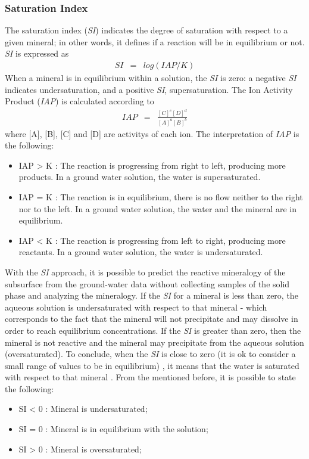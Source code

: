 \subsubsection{Saturation Index}
The saturation index (\emph{SI}) indicates the degree of saturation with respect to a given mineral; in other words, it defines if a reaction will be in equilibrium or not. \emph{SI} is expressed as
\begin{eqnarray} \label{eq:siEq}
SI &=& log (IAP / K )
\end{eqnarray}
When a mineral is in equilibrium within a solution, the \emph{SI} is zero: a negative \emph{SI} indicates undersaturation, and a positive \emph{SI}, supersaturation. 
The Ion Activity Product (\emph{IAP}) is calculated according to
\begin{eqnarray}
IAP &=& \frac{[C]^c [D]^d}{[A]^a[B]^b}
\end{eqnarray}
where [A], [B], [C] and [D] are activitys of each ion. The interpretation of \emph{IAP} is the following:
\begin{itemize}
\item IAP > K : The reaction is progressing from right to left, producing more products. In a ground water solution, the water is supersaturated.
\item IAP = K : The reaction is in equilibrium, there is no flow neither to the right nor to the left. In a ground water solution, the water and the mineral are in equilibrium.
\item IAP < K : The reaction is progressing from left to right, producing more reactants. In a ground water solution, the water is undersaturated.
\end{itemize}

With the \emph{SI} approach, it is possible to predict the reactive mineralogy of the subsurface from the ground-water data without collecting samples of the solid phase and analyzing the mineralogy. If the \emph{SI} for a mineral is less than zero, the aqueous solution is undersaturated with respect to that mineral - which corresponds to the fact that the mineral will not precipitate and may dissolve in order to reach equilibrium concentrations. If the \emph{SI} is greater than zero, then the mineral is not reactive and the mineral may precipitate from the aqueous solution (oversaturated). To conclude, when the \emph{SI} is close to zero (it is ok to consider a small range of values to be in equilibrium) , it means that the water is saturated  with respect to that mineral \cite{Alley:93}. From the mentioned before, it is possible to state the following:
\begin{itemize}
\item SI < 0 : Mineral is undersaturated;
\item SI = 0 : Mineral is in equilibrium with the solution;
\item SI > 0 : Mineral is oversaturated;
\end{itemize}

